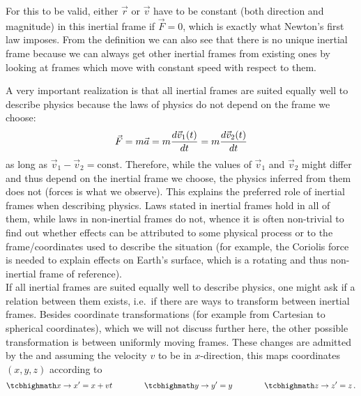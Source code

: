 For this to be valid, either $\vec{r}$ or $\vec{v}$ have to be constant (both direction and magnitude) in this inertial frame if $\vec{F} = 0$, which is exactly what Newton's first law imposes. From the definition we can also see that there is no unique inertial frame because we can always get other inertial frames from existing ones by looking at frames which move with constant speed with respect to them.

A very important realization is that all inertial frames are suited equally well to describe physics because the laws of physics do not depend on the frame we choose:
\begin{equation}
	\vec{F} = m \vec{a} = m \dv{\vec{v}_1(t)}{t} = m \dv{\vec{v}_2(t)}{t}
\end{equation}
as long as $\vec{v}_1 - \vec{v}_2 = \text{const}$. Therefore, while the values of $\vec{v}_1$ and $\vec{v}_2$ might differ and thus depend on the inertial frame we choose, the physics inferred from them does not (forces is what we observe). This explains the preferred role of inertial frames when describing physics. Laws stated in inertial frames hold in all of them, while laws in non-inertial frames do not, whence it is often non-trivial to find out whether effects can be attributed to some physical process or to the frame/coordinates used to describe the situation (for example, the Coriolis force is needed to explain effects on Earth's surface, which is a rotating and thus non-inertial frame of reference).\\


If all inertial frames are suited equally well to describe physics, one might ask if a relation between them exists, i.e.~if there are ways to transform between inertial frames. Besides coordinate transformations (for example from Cartesian to spherical coordinates), which we will not discuss further here, the other possible transformation is between uniformly moving frames. These changes are admitted by the  and assuming the velocity $v$ to be in $x$-direction, this maps coordinates $(x, y, z)$ according to
\begin{equation}\label{eq:galilei}
	\eqbox{
	x \rightarrow x' = x + v t
	}
	\qquad \qquad
	\eqbox{
	y \rightarrow y' = y
	}
	\qquad \qquad
	\eqbox{
	z \rightarrow z' = z
	} \, .
\end{equation}




